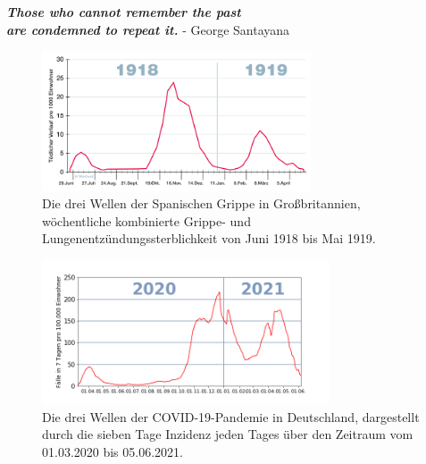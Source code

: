 \vspace*{15pt}
\begin{center}
    \huge{\textbf{
    \textit{Those who cannot remember the past\\ are condemned to repeat it.}}}
    \large{- George Santayana \autocite{history-quoteSantayana}}
\end{center}
\vspace*{65pt}
\begin{figure}[h]
    \centering
    \includegraphics[width=0.71\textwidth]{figures/vor_dem_Inhaltsverzeichniss/Spanische_Grippe_1918_1919_GB.svg.png}
    \caption{Die drei Wellen der \glqq{}Spanischen Grippe\grqq{} in Großbritannien, wöchentliche kombinierte Grippe- und Lungenentzündungssterblichkeit von Juni 1918 bis Mai 1919. \autocite{spanischflu}}
    \label{fig:spanishflu}
\end{figure}

\begin{figure}[h]
    \centering
    \includegraphics[width=0.76\textwidth]{figures/vor_dem_Inhaltsverzeichniss/Inzidenz Deutschland.png}
    \caption{Die drei Wellen der COVID-19-Pandemie in Deutschland, dargestellt durch die sieben Tage Inzidenz jeden Tages über den Zeitraum vom 01.03.2020 bis 05.06.2021.}
    \label{fig:germany_incidence}
\end{figure}